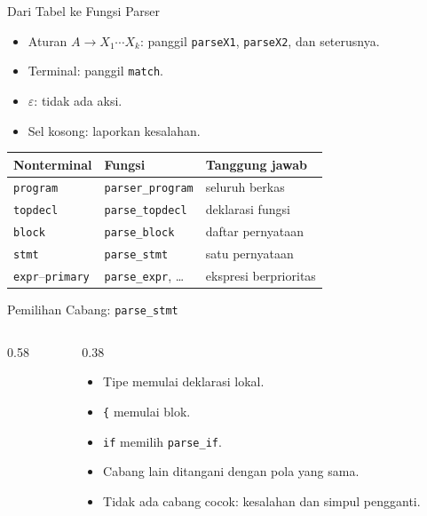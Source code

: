 \documentclass[aspectratio=169,10pt,t]{beamer}
\begin{document}
\begin{frame}{Dari Tabel ke Fungsi Parser}
  \begin{itemize}
    \item Aturan \(A \to X_1\cdots X_k\): panggil
          \texttt{parseX1}, \texttt{parseX2}, dan seterusnya.
    \item Terminal: panggil \texttt{match}.
    \item \(\varepsilon\): tidak ada aksi.
    \item Sel kosong: laporkan kesalahan.
  \end{itemize}

  \vspace{4pt}
  \small
  \setlength{\tabcolsep}{4pt}
  \begin{tabular}{@{}p{3.4cm}p{4.4cm}p{5.6cm}@{}}
    \toprule
    \textbf{Nonterminal} & \textbf{Fungsi} & \textbf{Tanggung jawab} \\
    \midrule
    \texttt{program} & \texttt{parser\_program} & seluruh berkas \\
    \texttt{topdecl} & \texttt{parse\_topdecl} & deklarasi fungsi \\
    \texttt{block} & \texttt{parse\_block} & daftar pernyataan \\
    \texttt{stmt} & \texttt{parse\_stmt} & satu pernyataan \\
    \texttt{expr}--\texttt{primary} & \texttt{parse\_expr}, \ldots &
      ekspresi berprioritas \\
    \bottomrule
  \end{tabular}
\end{frame}

\begin{frame}[fragile]{Pemilihan Cabang: \texttt{parse\_stmt}}
  \begin{columns}[T,onlytextwidth]
    \begin{column}{0.58\textwidth}
      
    \end{column}
    \begin{column}{0.38\textwidth}
      \begin{itemize}
        \item Tipe memulai deklarasi lokal.
        \item \texttt{\{} memulai blok.
        \item \texttt{if} memilih \texttt{parse\_if}.
        \item Cabang lain ditangani dengan pola yang sama.
        \item Tidak ada cabang cocok: kesalahan dan simpul pengganti.
      \end{itemize}
    \end{column}
  \end{columns}
\end{frame}
\end{document}
